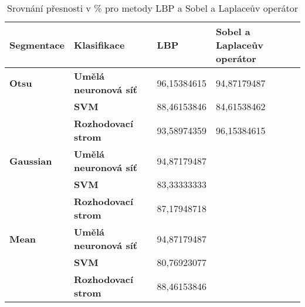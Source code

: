 \capstartfalse
\begin{table}[!htbp]
\begin{tabular}{|l|l|l|l|}
\hline
\textbf{Segmentace} & \textbf{Klasifikace}         & \textbf{LBP} & \textbf{Sobel a Laplaceův operátor} \\ \hline
\textbf{Otsu}       & \textbf{Umělá neuronová síť} & 96,15384615  & 94,87179487                         \\ \hline
\textbf{}           & \textbf{SVM}                 & 88,46153846  & 84,61538462                         \\ \hline
\textbf{}           & \textbf{Rozhodovací strom}   & 93,58974359  & 96,15384615                         \\ \hline
\textbf{Gaussian}   & \textbf{Umělá neuronová síť} & 94,87179487  &                                     \\ \hline
\textbf{}           & \textbf{SVM}                 & 83,33333333  &                                     \\ \hline
\textbf{}           & \textbf{Rozhodovací strom}   & 87,17948718  &                                     \\ \hline
\textbf{Mean}       & \textbf{Umělá neuronová síť} & 94,87179487  &                                     \\ \hline
\textbf{}           & \textbf{SVM}                 & 80,76923077  &                                     \\ \hline
\textbf{}           & \textbf{Rozhodovací strom}   & 88,46153846  &                                     \\ \hline
\end{tabular}
\caption{Srovnání přesnosti v \% pro metody LBP a Sobel a Laplaceův operátor }
\end{table}
\capstarttrue


